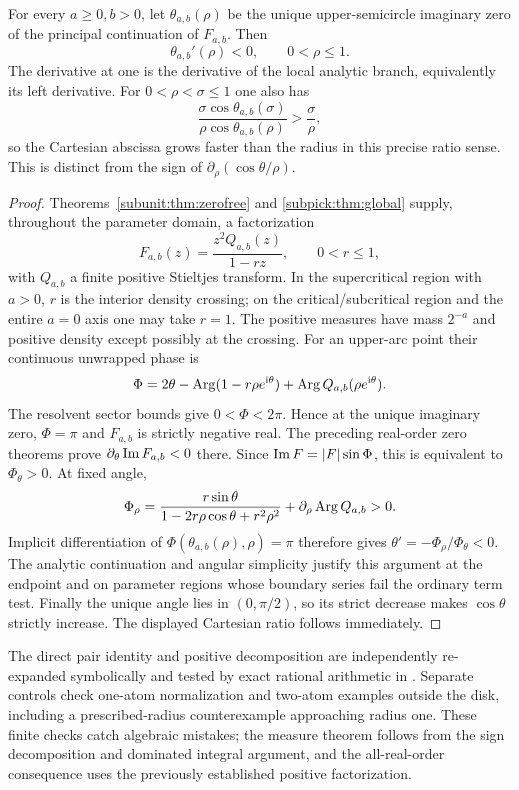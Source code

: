\begin{corollary}
\label{radpick:cor:real-orders}
For every $a\ge0,b>0$, let $\theta_{a,b}(\rho)$ be the unique
upper-semicircle imaginary zero of the principal continuation of $F_{a,b}$.
Then
\[
 \theta_{a,b}'(\rho)<0,\qquad 0<\rho\le1.
\]
The derivative at one is the derivative of the local analytic branch,
equivalently its left derivative. For $0<\rho<\sigma\le1$ one also has
\[
 \frac{\sigma\cos\theta_{a,b}(\sigma)}
      {\rho\cos\theta_{a,b}(\rho)}>\frac\sigma\rho,
\]
so the Cartesian abscissa grows faster than the radius in this precise
ratio sense. This is distinct from the sign of
$\partial_\rho(\cos\theta/\rho)$.
\end{corollary}
\begin{proof}
Theorems~\ref{subunit:thm:zerofree} and \ref{subpick:thm:global} supply,
throughout the parameter domain, a factorization
\[
 F_{a,b}(z)=\frac{z^2Q_{a,b}(z)}{1-rz},\qquad 0<r\le1,
\]
with $Q_{a,b}$ a finite positive Stieltjes transform. In the
supercritical region with $a>0$, $r$ is the interior density crossing;
on the critical/subcritical region and the entire $a=0$ axis one may
take $r=1$. The positive measures have mass $2^{-a}$ and positive
density except possibly at the crossing. For an upper-arc point their
continuous unwrapped phase is
\[
 \Phi=2\theta-\operatorname{Arg}(1-r\rho e^{\mathrm{i}\theta})
                         +\operatorname{Arg} Q_{a,b}(\rho e^{\mathrm{i}\theta}).
\]
The resolvent sector bounds give $0<\Phi<2\pi$. Hence at the unique
imaginary zero, $\Phi=\pi$ and $F_{a,b}$ is strictly negative real.
The preceding real-order zero theorems prove
$\partial_\theta\operatorname{Im} F_{a,b}<0$ there. Since
$\operatorname{Im} F=|F|\sin\Phi$, this is equivalent to $\Phi_\theta>0$.
At fixed angle,
\[
 \Phi_\rho=\frac{r\sin\theta}
        {1-2r\rho\cos\theta+r^2\rho^2}
                 +\partial_\rho\operatorname{Arg} Q_{a,b}>0.
\]
Implicit differentiation of $\Phi(\theta_{a,b}(\rho),\rho)=\pi$
therefore gives $\theta'=-\Phi_\rho/\Phi_\theta<0$.
The analytic continuation and angular simplicity justify this argument
at the endpoint and on parameter regions whose boundary series fail
the ordinary term test. Finally the unique angle lies in $(0,\pi/2)$,
so its strict decrease makes $\cos\theta$ strictly increase. The
displayed Cartesian ratio follows immediately.
\end{proof}

The direct pair identity and positive decomposition are independently
re-expanded symbolically and tested by exact rational arithmetic in
. Separate controls check
one-atom normalization and two-atom examples outside the disk, including
a prescribed-radius counterexample approaching radius one. These finite
checks catch algebraic mistakes; the measure theorem follows from the
sign decomposition and dominated integral argument, and the all-real-order
consequence uses the previously established positive factorization.
